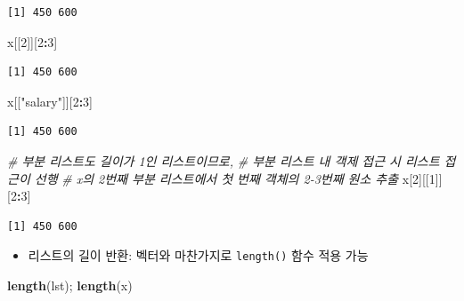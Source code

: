 \documentclass[
  11pt,
]{krantz}
\newenvironment{Shaded}{\begin{snugshade}}{\end{snugshade}}
\newcommand{\CommentTok}[1]{\textcolor[rgb]{0.37,0.37,0.37}{\textit{#1}}}
\newcommand{\DecValTok}[1]{\textcolor[rgb]{0.06,0.06,0.06}{#1}}
\newcommand{\KeywordTok}[1]{\textcolor[rgb]{0.27,0.27,0.27}{\textbf{#1}}}
\newcommand{\NormalTok}[1]{#1}
\newcommand{\OperatorTok}[1]{\textcolor[rgb]{0.43,0.43,0.43}{\textbf{#1}}}
\newcommand{\StringTok}[1]{\textcolor[rgb]{0.5,0.5,0.5}{#1}}
\providecommand{\tightlist}{%
  \setlength{\itemsep}{0pt}\setlength{\parskip}{0pt}}
\begin{document}
\begin{verbatim}
[1] 450 600
\end{verbatim}

\begin{Shaded}
\begin{Highlighting}[]
\NormalTok{x[[}\DecValTok{2}\NormalTok{]][}\DecValTok{2}\OperatorTok{:}\DecValTok{3}\NormalTok{]}
\end{Highlighting}
\end{Shaded}

\begin{verbatim}
[1] 450 600
\end{verbatim}

\begin{Shaded}
\begin{Highlighting}[]
\NormalTok{x[[}\StringTok{"salary"}\NormalTok{]][}\DecValTok{2}\OperatorTok{:}\DecValTok{3}\NormalTok{]}
\end{Highlighting}
\end{Shaded}

\begin{verbatim}
[1] 450 600
\end{verbatim}

\begin{Shaded}
\begin{Highlighting}[]
\CommentTok{# 부분 리스트도 길이가 1인 리스트이므로, }
\CommentTok{# 부분 리스트 내 객제 접근 시 리스트 접근이 선행}
\CommentTok{# x의 2번째 부분 리스트에서 첫 번째 객체의 2-3번째 원소 추출}
\NormalTok{x[}\DecValTok{2}\NormalTok{][[}\DecValTok{1}\NormalTok{]][}\DecValTok{2}\OperatorTok{:}\DecValTok{3}\NormalTok{]}
\end{Highlighting}
\end{Shaded}

\begin{verbatim}
[1] 450 600
\end{verbatim}

\normalsize

\begin{itemize}
\tightlist
\item
  리스트의 길이 반환: 벡터와 마찬가지로 \texttt{length()} 함수 적용 가능
\end{itemize}

\footnotesize

\begin{Shaded}
\begin{Highlighting}[]
\KeywordTok{length}\NormalTok{(lst); }\KeywordTok{length}\NormalTok{(x)}
\end{Highlighting}
\end{Shaded}
\end{document}
